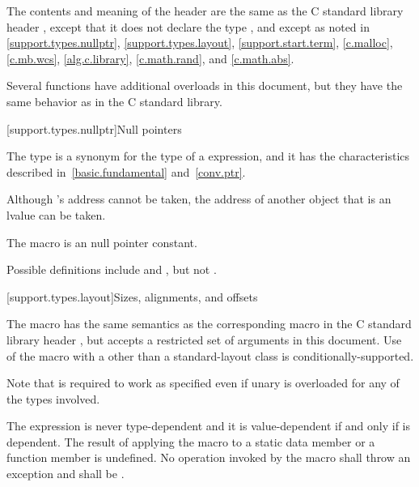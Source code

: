 \pnum
The contents and meaning of the header  are the same as
the C standard library header ,
except that it does not declare the type ,
and except as noted in
\ref{support.types.nullptr},
\ref{support.types.layout},
\ref{support.start.term},
\ref{c.malloc},
\ref{c.mb.wcs},
\ref{alg.c.library},
\ref{c.math.rand}, and
\ref{c.math.abs}.
\begin{note}
Several functions have additional overloads in this document,
but they have the same behavior as in the C standard library.
\end{note}


[support.types.nullptr]{Null pointers}

\pnum
{}%
The type  is a synonym
for the type of a  expression, and it
has the characteristics
described in~\ref{basic.fundamental} and~\ref{conv.ptr}.
\begin{note}
Although 's address cannot be taken, the address of another
 object that is an lvalue can be taken.
\end{note}

\pnum
The macro
%
is an  null pointer constant.
\begin{footnote}
Possible definitions include
and
,
but not
.
\end{footnote}


[support.types.layout]{Sizes, alignments, and offsets}

\pnum
The macro
%
has the same semantics as the corresponding macro in
the C standard library header , but
accepts a restricted set of 
arguments in this document.
Use of the  macro with a 
other than a standard-layout class
is conditionally-supported.
\begin{footnote}
Note that 
is required to work as specified even if unary
is overloaded for any of the types involved.
\end{footnote}
The expression 
is never type-dependent and it is
value-dependent if and only if  is
dependent. The result of applying the  macro to
a static data member or a function member is undefined.
No operation invoked by the  macro shall throw an exception and
 shall be .

